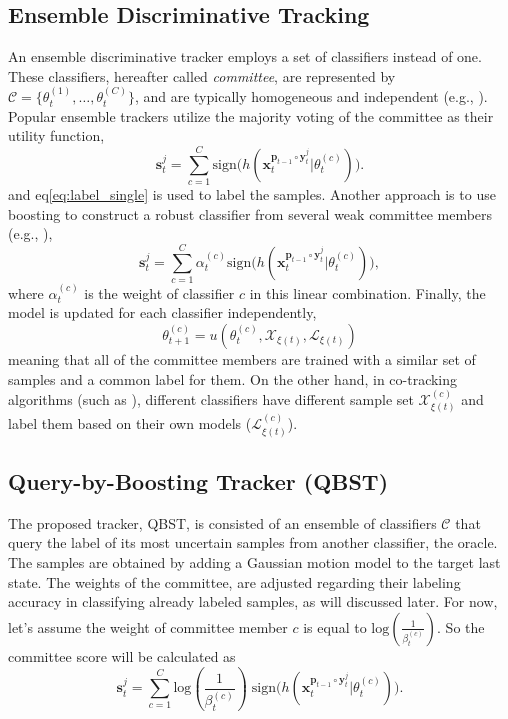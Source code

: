 \documentclass[10pt, conference, compsocconf]{IEEEtran}
\begin{document}
\subsection{Ensemble Discriminative Tracking}
An ensemble discriminative tracker employs a set of classifiers instead of one. These classifiers, hereafter called \textit{committee}, are represented by $\mathcal{C}=\{\theta_t^{(1)},\ldots,\theta_t^{(C)}\}$, and are typically homogeneous and independent (e.g.,  \cite{saffari2009line,leistner2010miforests}). Popular ensemble trackers utilize the majority voting of the committee as their utility function,
\begin{equation}
\mathbf{s}^j_t = \sum_{c=1}^C \mathrm{sign} \big( h(\mathbf{x}_t^{\mathbf{p}_{t-1} \circ \mathbf{y}_t^j} | \theta_t^{(c)}) \big).
\label{eq:score_ensemble}
\end{equation}
and eq\eqref{eq:label_single} is used to label the samples. Another approach is to use boosting to construct a robust classifier from several weak committee members (e.g., \cite{grabner2006real}),
\begin{equation}
\mathbf{s}^j_t = \sum_{c=1}^C \alpha_t^{(c)} \mathrm{sign} \big( h(\mathbf{x}_t^{\mathbf{p}_{t-1} \circ \mathbf{y}_t^j} | \theta_t^{(c)}) \big),
\label{eq:score_ensemble_boost}
\end{equation}
where $\alpha_t^{(c)}$ is the weight of classifier $c$ in this linear combination.
Finally, the model is updated for each classifier independently,
\begin{equation}
\theta^{(c)}_{t+1} = u(\theta^{(c)}_t, \mathcal{X}_{\xi(t)}, \mathcal{L}_{\xi(t)})
\label{eq:update_ensemble}
\end{equation}
meaning that all of the committee members are trained with a similar set of samples and a common label for them.
On the other hand, in co-tracking algorithms (such as \cite{tang2007co}), different classifiers have different sample set $\mathcal{X}^{(c)}_{\xi(t)}$ and label them based on their own models ($\mathcal{L}^{(c)}_{\xi(t)}$). 

\subsection{Query-by-Boosting Tracker (QBST)}
\label{sec:qbst}
The proposed tracker, QBST, is consisted of an ensemble of classifiers $\mathcal{C}$ that query the label of its most uncertain samples from another classifier, the oracle. The samples are obtained by adding a Gaussian motion model to the target last state. The weights of the committee, are adjusted regarding their labeling accuracy in classifying already labeled samples, as will discussed later. For now, let's assume the weight of committee member $c$ is equal to $\mathrm{log}(\frac{1}{\beta_t^{(c)}})$. So the committee score will be calculated as
\begin{equation}
\mathbf{s}^j_t = \sum_{c=1}^C \mathrm{log}(\frac{1}{\beta_t^{(c)}}) \; \mathrm{sign} \big( h(\mathbf{x}_t^{\mathbf{p}_{t-1} \circ \mathbf{y}_t^j} | \theta_t^{(c)}) \big).
\label{eq:score_qbst}
\end{equation}
\end{document}
